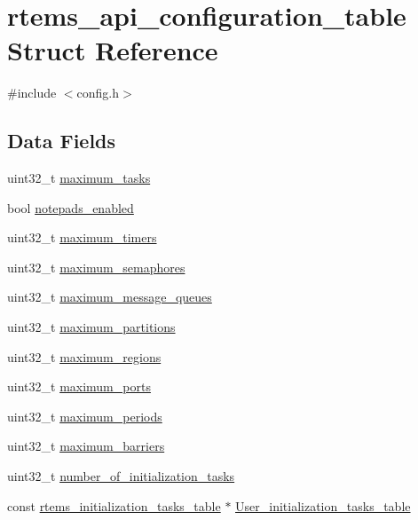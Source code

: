 \hypertarget{structrtems__api__configuration__table}{}\section{rtems\+\_\+api\+\_\+configuration\+\_\+table Struct Reference}
\label{structrtems__api__configuration__table}


{\ttfamily \#include $<$config.\+h$>$}

\subsection*{Data Fields}
\begin{DoxyCompactItemize}
\item 
uint32\+\_\+t \mbox{\hyperlink{structrtems__api__configuration__table_a2cccd897b4249543014688c2105466fa}{maximum\+\_\+tasks}}
\item 
bool \mbox{\hyperlink{structrtems__api__configuration__table_af519b7d506d516fda8ecead39f8fe61e}{notepads\+\_\+enabled}}
\item 
uint32\+\_\+t \mbox{\hyperlink{structrtems__api__configuration__table_ada7aa918c09d37763a02c68a5f233f9a}{maximum\+\_\+timers}}
\item 
uint32\+\_\+t \mbox{\hyperlink{structrtems__api__configuration__table_a00ef2e0c0248d3bdf3b13c0864757f06}{maximum\+\_\+semaphores}}
\item 
uint32\+\_\+t \mbox{\hyperlink{structrtems__api__configuration__table_a94ef0a5edf4ef3eafcb5a36a123b78b6}{maximum\+\_\+message\+\_\+queues}}
\item 
uint32\+\_\+t \mbox{\hyperlink{structrtems__api__configuration__table_a5f6a3407f0b9e27067bde4743f52fbc5}{maximum\+\_\+partitions}}
\item 
uint32\+\_\+t \mbox{\hyperlink{structrtems__api__configuration__table_ab84d6d812bd85b907547f24bd95f9f0b}{maximum\+\_\+regions}}
\item 
uint32\+\_\+t \mbox{\hyperlink{structrtems__api__configuration__table_a120ba454da6de3ede01da0b185ffb5a7}{maximum\+\_\+ports}}
\item 
uint32\+\_\+t \mbox{\hyperlink{structrtems__api__configuration__table_a851efb35106dca09e0fc15794ef70e02}{maximum\+\_\+periods}}
\item 
uint32\+\_\+t \mbox{\hyperlink{structrtems__api__configuration__table_ad266904a40743b519078b5863bdde0f3}{maximum\+\_\+barriers}}
\item 
uint32\+\_\+t \mbox{\hyperlink{structrtems__api__configuration__table_a53cd94082a80520fae49b306c529ef8f}{number\+\_\+of\+\_\+initialization\+\_\+tasks}}
\item 
const \mbox{\hyperlink{structrtems__initialization__tasks__table}{rtems\+\_\+initialization\+\_\+tasks\+\_\+table}} $\ast$ \mbox{\hyperlink{structrtems__api__configuration__table_a776059a5622c1486b36fa36b8821b2b1}{User\+\_\+initialization\+\_\+tasks\+\_\+table}}
\end{DoxyCompactItemize}


